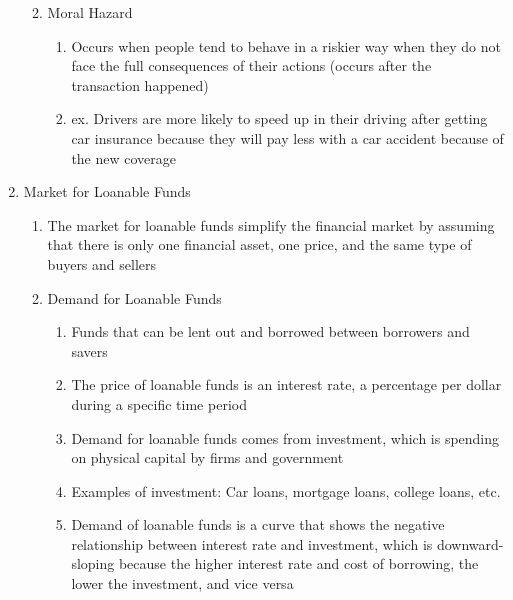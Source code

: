 \documentclass[12pt]{article}
\begin{document}
\begin{enumerate}
\begin{enumerate}
\begin{enumerate}
            \end{enumerate}

          \item Moral Hazard

            \begin{enumerate}

              \item Occurs when people tend to behave in a riskier way when they do not face the full consequences of their actions (occurs after the transaction happened)

              \item ex. Drivers are more likely to speed up in their driving after getting car insurance because they will pay less with a car accident because of the new coverage

            \end{enumerate}

        \end{enumerate}

      \item Market for Loanable Funds

        \begin{enumerate}

          \item The market for loanable funds simplify the financial market by assuming that there is only one financial asset, one price, and the same type of buyers and sellers

          \item Demand for Loanable Funds

            \begin{enumerate}

              \item Funds that can be lent out and borrowed between borrowers and savers

              \item The price of loanable funds is an interest rate, a percentage per dollar during a specific time period

              \item Demand for loanable funds comes from investment, which is spending on physical capital by firms and government

              \item Examples of investment: Car loans, mortgage loans, college loans, etc.

              \item Demand of loanable funds is a curve that shows the negative relationship between interest rate and investment, which is downward-sloping because the higher interest rate and cost of borrowing, the lower the investment, and vice versa


\end{enumerate}
\end{enumerate}
\end{enumerate}
\end{document}
